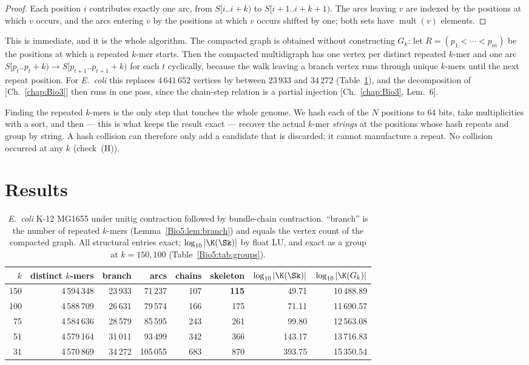 \begin{proof}
Each position $i$ contributes exactly one arc, from $S[i..i{+}k)$ to $S[i{+}1..i{+}k{+}1)$.
The arcs leaving $v$ are indexed by the positions at which $v$ occurs, and the arcs
entering $v$ by the positions at which $v$ occurs shifted by one; both sets have
$\operatorname{mult}(v)$ elements.
\end{proof}

This is immediate, and it is the whole algorithm. The compacted graph is obtained without
constructing $G_k$: let $R=(p_1<\cdots<p_m)$ be the positions at which a repeated $k$-mer
starts. Then the compacted multidigraph has one vertex per distinct repeated $k$-mer and
one arc $S[p_t..p_t{+}k)\to S[p_{t+1}..p_{t+1}{+}k)$ for each $t$ cyclically, because the
walk leaving a branch vertex runs through unique $k$-mers until the next repeat position.
For \emph{E.\ coli} this replaces $4\,641\,652$ vertices by between $23\,933$ and
$34\,272$ (Table~\ref{Bio5:tab:main}), and the decomposition of [Ch.~\ref{chap:Bio3}] then runs in one
pass, since the chain-step relation is a partial injection [Ch.~\ref{chap:Bio3}, Lem.~6].

Finding the repeated $k$-mers is the only step that touches the whole genome. We hash
each of the $N$ positions to $64$ bits, take multiplicities with a sort, and then --- this
is what keeps the result exact --- recover the actual $k$-mer \emph{strings} at the
positions whose hash repeats and group by string. A hash collision can therefore only
add a candidate that is discarded; it cannot manufacture a repeat. No collision occurred
at any $k$ (check~(H)).

\section{Results}\label{Bio5:sec:results}

\begin{table}[ht]
\centering\footnotesize
\begin{tabular}{rrrrrrrr}
\toprule
$k$ & distinct $k$-mers & branch & arcs & chains & skeleton
& $\log_{10}|\K(\Sk)|$ & $\log_{10}|\K(G_k)|$\\
\midrule
150 & 4\,594\,348 & 23\,933 & 71\,237 & 107 & \textbf{115} & 49.71 & 10\,488.89\\
100 & 4\,588\,709 & 26\,631 & 79\,574 & 166 & 175 & 71.11 & 11\,690.57\\
 75 & 4\,584\,636 & 28\,579 & 85\,595 & 243 & 261 & 99.80 & 12\,563.08\\
 51 & 4\,579\,164 & 31\,011 & 93\,499 & 342 & 366 & 143.17 & 13\,716.83\\
 31 & 4\,570\,869 & 34\,272 & 105\,055 & 683 & 870 & 393.75 & 15\,350.54\\
\bottomrule
\end{tabular}
\caption{\emph{E.\ coli} K-12 MG1655 under unitig contraction followed by bundle-chain
contraction. ``branch'' is the number of repeated $k$-mers (Lemma~\ref{Bio5:lem:branch}) and
equals the vertex count of the compacted graph. All structural entries exact;
$\log_{10}|\K(\Sk)|$ by float LU, and exact as a group at $k=150,100$
(Table~\ref{Bio5:tab:groups}).}
\label{Bio5:tab:main}
\end{table}

